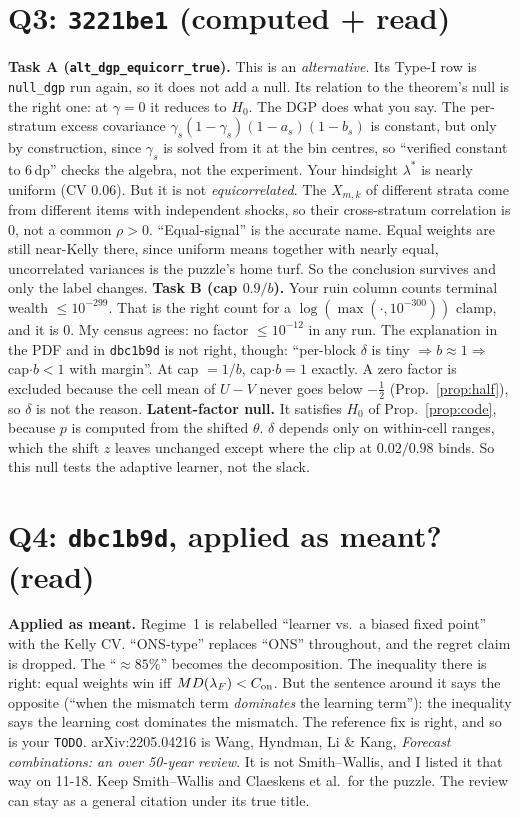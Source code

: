 \documentclass[11pt]{article}
\begin{document}
\section{Q3: \texttt{3221be1} (computed + read)}
\textbf{Task A (\texttt{alt\_dgp\_equicorr\_true}).} This is an \emph{alternative}. Its Type-I row is \texttt{null\_dgp} run again, so it does not add a null. Its relation to the theorem's null is the right one: at $\gamma=0$ it reduces to $H_0$.
The DGP does what you say. The per-stratum excess covariance $\gamma_s(1-\gamma_s)(1-a_s)(1-b_s)$ is constant, but only by construction, since $\gamma_s$ is solved from it at the bin centres, so ``verified constant to 6\,dp'' checks the algebra, not the experiment. Your hindsight $\lambda^\ast$ is nearly uniform (CV $0.06$).
But it is not \emph{equicorrelated}. The $X_{m,k}$ of different strata come from different items with independent shocks, so their cross-stratum correlation is $0$, not a common $\rho>0$. ``Equal-signal'' is the accurate name.
Equal weights are still near-Kelly there, since uniform means together with nearly equal, uncorrelated variances is the puzzle's home turf. So the conclusion survives and only the label changes.
\textbf{Task B (cap $0.9/b$).} Your ruin column counts terminal wealth $\le10^{-299}$. That is the right count for a $\log(\max(\cdot,10^{-300}))$ clamp, and it is $0$. My census agrees: no factor $\le10^{-12}$ in any run.
The explanation in the PDF and in \texttt{dbc1b9d} is not right, though: ``per-block $\delta$ is tiny $\Rightarrow b\approx1\Rightarrow$ cap$\cdot b<1$ with margin''. At cap $=1/b$, cap$\cdot b=1$ exactly. A zero factor is excluded because the cell mean of $U-V$ never goes below $-\tfrac12$ (Prop.~\ref{prop:half}), so $\delta$ is not the reason.
\textbf{Latent-factor null.} It satisfies $H_0$ of Prop.~\ref{prop:code}, because $p$ is computed from the shifted $\theta$. $\delta$ depends only on within-cell ranges, which the shift $z$ leaves unchanged except where the clip at $0.02/0.98$ binds. So this null tests the adaptive learner, not the slack.

\section{Q4: \texttt{dbc1b9d}, applied as meant? (read)}\label{sec:dbc}
\textbf{Applied as meant.} Regime~1 is relabelled ``learner vs.\ a biased fixed point'' with the Kelly CV. ``ONS-type'' replaces ``ONS'' throughout, and the regret claim is dropped.
The ``$\approx85\%$'' becomes the decomposition. The inequality there is right: equal weights win iff $MD(\lambda_F)<C_{\rm on}$. But the sentence around it says the opposite (``when the mismatch term \emph{dominates} the learning term''): the inequality says the learning cost dominates the mismatch.
The reference fix is right, and so is your \texttt{TODO}. arXiv:2205.04216 is Wang, Hyndman, Li \& Kang, \emph{Forecast combinations: an over 50-year review}. It is not Smith--Wallis, and I listed it that way on 11-18. Keep Smith--Wallis and Claeskens et al.\ for the puzzle. The review can stay as a general citation under its true title.
\end{document}
